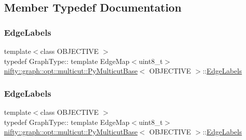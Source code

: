 \subsection{Member Typedef Documentation}
\mbox{\label{classnifty_1_1graph_1_1opt_1_1multicut_1_1PyMulticutBase_a326edf5f82eb28bfb7ce464b4056e9e8}} 
\subsubsection{\texorpdfstring{Edge\+Labels}{EdgeLabels}\hspace{0.1cm}{\footnotesize\ttfamily [1/2]}}
{\footnotesize\ttfamily template$<$class O\+B\+J\+E\+C\+T\+I\+VE $>$ \\
typedef Graph\+Type\+:: template Edge\+Map$<$uint8\+\_\+t$>$ \hyperlink{classnifty_1_1graph_1_1opt_1_1multicut_1_1PyMulticutBase}{nifty\+::graph\+::opt\+::multicut\+::\+Py\+Multicut\+Base}$<$ O\+B\+J\+E\+C\+T\+I\+VE $>$\+::\hyperlink{classnifty_1_1graph_1_1opt_1_1multicut_1_1PyMulticutBase_a326edf5f82eb28bfb7ce464b4056e9e8}{Edge\+Labels}}

\mbox{\label{classnifty_1_1graph_1_1opt_1_1multicut_1_1PyMulticutBase_a326edf5f82eb28bfb7ce464b4056e9e8}} 
\subsubsection{\texorpdfstring{Edge\+Labels}{EdgeLabels}\hspace{0.1cm}{\footnotesize\ttfamily [2/2]}}
{\footnotesize\ttfamily template$<$class O\+B\+J\+E\+C\+T\+I\+VE $>$ \\
typedef Graph\+Type\+:: template Edge\+Map$<$uint8\+\_\+t$>$ \hyperlink{classnifty_1_1graph_1_1opt_1_1multicut_1_1PyMulticutBase}{nifty\+::graph\+::opt\+::multicut\+::\+Py\+Multicut\+Base}$<$ O\+B\+J\+E\+C\+T\+I\+VE $>$\+::\hyperlink{classnifty_1_1graph_1_1opt_1_1multicut_1_1PyMulticutBase_a326edf5f82eb28bfb7ce464b4056e9e8}{Edge\+Labels}}

